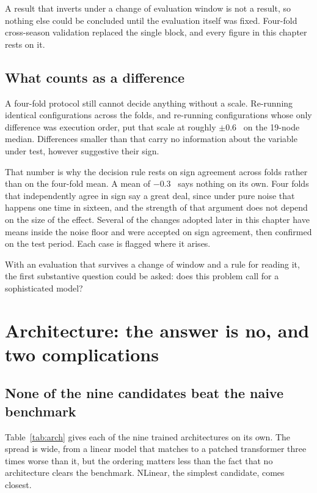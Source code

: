 A result that inverts under a change of evaluation window is not a result, so nothing else
could be concluded until the evaluation itself was fixed. Four-fold cross-season validation
replaced the single block, and every figure in this chapter rests on it.

\subsection{What counts as a difference}

A four-fold protocol still cannot decide anything without a scale. Re-running identical
configurations across the folds, and re-running configurations whose only difference was
execution order, put that scale at roughly $\pm 0.6$~\pp{} on the 19-node median.
Differences smaller than that carry no information about the variable under test, however
suggestive their sign.

That number is why the decision rule rests on sign agreement across folds rather than on
the four-fold mean. A mean of $-0.3$~\pp{} says nothing on its own. Four folds that
independently agree in sign say a great deal, since under pure noise that happens one time
in sixteen, and the strength of that argument does not depend on the size of the effect.
Several of the changes adopted later in this chapter have means inside the noise floor and
were accepted on sign agreement, then confirmed on the test period. Each case is flagged
where it arises.

With an evaluation that survives a change of window and a rule for reading it, the first
substantive question could be asked: does this problem call for a sophisticated model?

\section{Architecture: the answer is no, and two complications}
\label{sec:res-arch}

\subsection{None of the nine candidates beat the naive benchmark}

Table~\ref{tab:arch} gives each of the nine trained architectures on its own. The spread
is wide, from a linear model that matches \naiveA{} to a patched transformer three times
worse than it, but the ordering matters less than the fact that no architecture clears the
benchmark. NLinear, the simplest candidate, comes closest.

